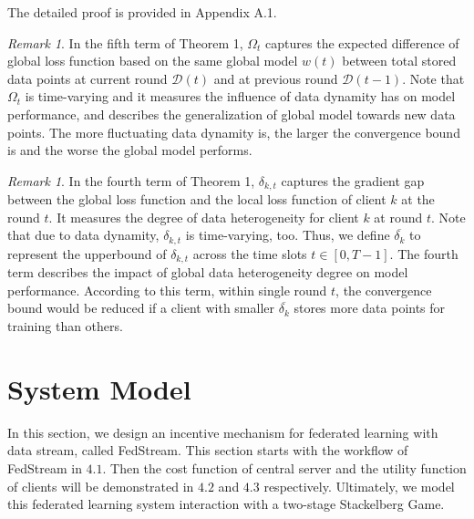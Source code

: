 \documentclass{article}
\theoremstyle{plain}
\theoremstyle{definition}
\theoremstyle{remark}
\newtheorem{remark}[theorem]{Remark}
\begin{document}
The detailed proof is provided in Appendix A.1.
\begin{remark}
  In the fifth term of Theorem 1, $\Omega_t$ captures the expected difference of global loss function based on the same global model $w(t)$ between total stored data points at current round $\mathcal{D}(t)$ and at previous round $\mathcal{D}(t-1)$.
  Note that $\Omega_t$ is time-varying and it measures the influence of data dynamity has on model performance, and describes the generalization of global model towards new data points. 
  The more fluctuating data dynamity is, the larger the convergence bound is and the worse the global model performs. 
\end{remark}
\begin{remark}
  In the fourth term of Theorem 1, $\delta_{k,t}$ captures the gradient gap between the global loss function and the local loss function of client $k$ at the round $t$. 
  It measures the degree of data heterogeneity for client $k$ at round $t$. Note that due to data dynamity, $\delta_{k,t}$ is time-varying, too.
  Thus, we define $\overline{\delta_k}$ to represent the upperbound of $\delta_{k,t}$ across the time slots $t \in [0, T-1]$. The fourth term describes the impact of global data heterogeneity degree on model performance.
  According to this term, within single round $t$, the convergence bound would be reduced if a client with smaller $\overline{\delta_k}$ stores more data points for training than others.
\end{remark}

\section{System Model}
In this section, we design an incentive mechanism for federated learning with data stream, called FedStream.
This section starts with the workflow of FedStream in $4.1$. Then the cost function of central server and the utility function of clients will be demonstrated in $4.2$ and $4.3$ respectively.
Ultimately, we model this federated learning system interaction with a two-stage Stackelberg Game.
\end{document}
